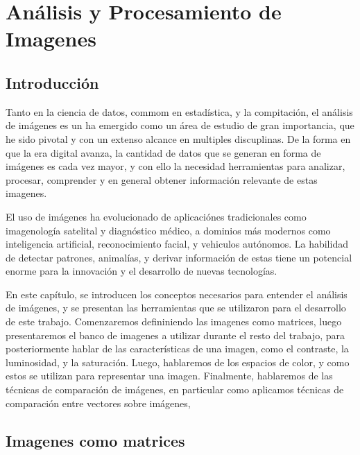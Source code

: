 \chapter{Análisis y Procesamiento de Imagenes }\label{chap3}

\section{Introducci\'on}

Tanto en la ciencia de datos, commom en estad\'istica, y la compitaci\'on, el an\'alisis de im\'agenes es un ha emergido como un \'area de estudio de gran importancia, que he sido pivotal y con un extenso alcance en multiples discuplinas. De la forma en que la era digital avanza, la cantidad de datos que se generan en forma de im\'agenes es cada vez mayor, y con ello la necesidad herramientas para analizar, procesar, comprender y en general obtener informaci\'on relevante de estas imagenes. 

El uso de im\'agenes ha evolucionado de aplicaci\'ones tradicionales como imagenolog\'ia satelital y diagn\'ostico m\'edico, a dominios m\'as modernos como inteligencia artificial, reconocimiento facial, y vehiculos aut\'onomos. La habilidad de detectar patrones, animal\'ias, y derivar informaci\'on de estas tiene un potencial enorme para la innovaci\'on y el desarrollo de nuevas tecnolog\'ias. 

En este cap\'itulo, se introducen los conceptos necesarios para entender el an\'alisis de im\'agenes, y se presentan las herramientas que se utilizaron para el desarrollo de este trabajo. Comenzaremos defininiendo las imagenes como matrices, luego presentaremos el banco de imagenes a utilizar durante el resto del trabajo, para posteriormente hablar de las caracter\'isticas de una imagen, como el contraste, la luminosidad, y la saturaci\'on. Luego, hablaremos de los espacios de color, y como estos se utilizan para representar una imagen. Finalmente, hablaremos de las t\'ecnicas de comparaci\'on de im\'agenes, en particular como aplicamos t\'ecnicas de comparaci\'on entre vectores sobre im\'agenes,

\section{Imagenes como matrices}

